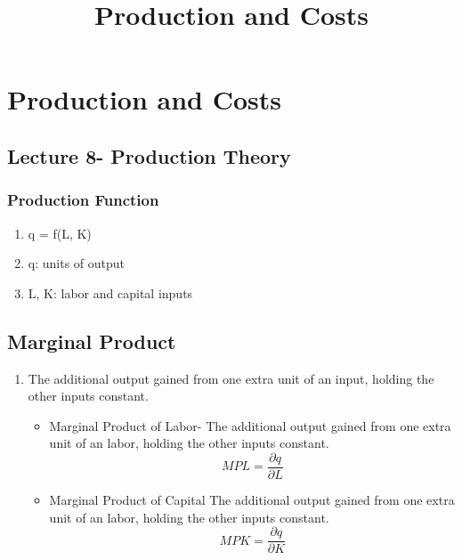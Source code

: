 \documentclass[a4paper]{article}
\title{Production and Costs}
\begin{document}
\maketitle
\section{Production and Costs}
\subsection{Lecture 8- Production Theory}
\subsubsection{Production Function}
\begin{enumerate}
    \item q = f(L, K)
    \item q: units of output
    \item L, K: labor and capital inputs
\end{enumerate}
\subsection{Marginal Product}
\begin{enumerate}
  \item The additional output gained from one extra unit of an input, holding the other inputs constant.
   \begin{itemize}
     \item Marginal Product of Labor- The additional output gained from one extra unit of an labor, holding the other inputs constant. 
     \begin{displaymath}
     MP L = \frac{\partial q}{\partial L}   
     \end{displaymath}
     \item Marginal Product of Capital The additional output gained from one extra unit of an labor, holding the other inputs constant.
     \begin{displaymath}
     MP K = \frac{\partial q}{\partial K}   
     \end{displaymath}
   \end{itemize}
\end{enumerate}
\end{document}
